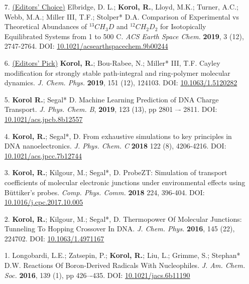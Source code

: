 \begin{enumerate}
	\item[7.] \underline{(Editors' Choice)} Elbridge, D. L.; \textbf{Korol, R.}, Lloyd, M.K.; Turner, A.C.; Webb, M.A.; Miller III, T.F.; Stolper* D.A.
Comparison of Experimental vs Theoretical Abundances of $^{13}CH_3D$ and $^{12}CH_2D_2$ for Isotopically Equilibrated Systems from 1 to 500 \degree C. \textit{ACS Earth Space Chem.} \textbf{2019}, 3 (12), 2747-2764. DOI: \href{https://pubs.acs.org/doi/10.1021/acsearthspacechem.9b00244}{10.1021/acsearthspacechem.9b00244}
\vspace{0.1cm}

	\item[6.] \underline{(Editors' Pick)} \textbf{Korol, R.}; Bou-Rabee,  N.; Miller* III, T.F. Cayley modification for strongly stable path-integral and ring-polymer molecular dynamics. \textit{J. Chem. Phys.} \textbf{2019}, 151 (12), 124103. DOI: \href{https://aip.scitation.org/doi/10.1063/1.5120282}{10.1063/1.5120282}
\vspace{0.1cm}

	\item[5.] \textbf{Korol R.}; Segal* D. Machine Learning Prediction of DNA Charge Transport. \textit{J. Phys. Chem. B}, \textbf{2019}, 123 (13), pp 2801 –- 2811. DOI: \href{https://pubs.acs.org/doi/full/10.1021/acs.jpcb.8b12557}{10.1021/acs.jpcb.8b12557}
\vspace{0.1cm}
	
	\item[4.] \textbf{Korol, R.}; Segal*, D. From exhaustive simulations to key principles in DNA nanoelectronics. \textit{J. Phys. Chem. C} \textbf{2018} 122 (8), 4206-4216. DOI: \href{https://pubs.acs.org/doi/abs/10.1021/acs.jpcc.7b12744}{10.1021/acs.jpcc.7b12744}
\vspace{0.1cm}

	\item[3.] \textbf{Korol, R.}; Kilgour,  M.; Segal*, D. ProbeZT: Simulation of transport coefficients of molecular electronic junctions under environmental effects using B\"uttiker’s probes. \textit{Comp. Phys. Comm.} \textbf{2018} 224, 396-404. DOI: \href{https://doi.org/10.1016/j.cpc.2017.10.005}{10.1016/j.cpc.2017.10.005}
\vspace{0.1cm}

	\item[2.] \textbf{Korol, R.}; Kilgour,  M.; Segal*, D. Thermopower Of Molecular Junctions: Tunneling To Hopping Crossover In DNA. \textit{J. Chem. Phys.} \textbf{2016}, 145 (22), 224702. DOI: \href{http://aip.scitation.org/doi/abs/10.1063/1.4971167}{10.1063/1.4971167}
\vspace{-0.2cm}

	\item[1.] Longobardi, L.E.; Zatsepin, P.; \textbf{Korol, R.}; Liu, L.; Grimme, S.; Stephan* D.W. Reactions Of Boron-Derived Radicals With Nucleophiles. \textit{J. Am. Chem. Soc.} \textbf{2016}, 139 (1), pp 426–-435. DOI: \href{http://pubs.acs.org/doi/abs/10.1021/jacs.6b11190}{10.1021/jacs.6b11190}
\end{enumerate}